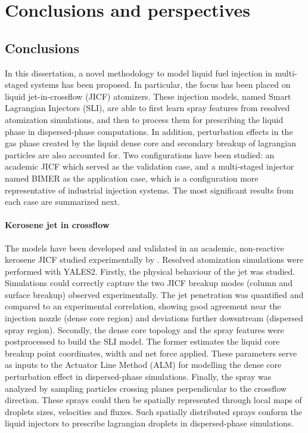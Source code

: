 \chapter{Conclusions and perspectives}

\section*{Conclusions}

In this dissertation, a novel methodology to model liquid fuel injection in multi-staged systems has been proposed. In particular, the focus has been placed on liquid jet-in-crossflow (JICF) atomizers. These injection models, named Smart Lagrangian Injectors (SLI), are able to first learn spray features from resolved atomization simulations, and then to process them for prescribing the liquid phase in dispersed-phase computations. In addition, perturbation effects in the gas phase created by the liquid dense core and secondary breakup of lagrangian particles are also accounted for. Two configurations have been studied: an academic JICF which served as the validation case, and a multi-staged injector named BIMER as the application case, which is a configuration more representative of industrial injection systems. The most significant results from each case are summarized next.


\subsubsection*{Kerosene jet in crossflow}

The models have been developed and validated in an academic, non-reactive kerosene JICF studied experimentally by . Resolved atomization simulations were performed with YALES2. Firstly, the physical behaviour of the jet was studied. Simulations could correctly capture the two JICF breakup modes (column and surface breakup) observed experimentally.  The jet penetration was quantified and compared to an experimental correlation, showing good agreement near the injection nozzle (dense core region) and deviations further dowsntream (dispersed spray region). Secondly, the dense core topology and the spray features were postprocessed to build the SLI model. The former estimates the liquid core breakup point coordinates, width and net force applied. These parameters serve as inputs to the Actuator Line Method (ALM) for modelling the dense core perturbation effect in dispersed-phase simulations. Finally, the spray was analyzed by sampling particles crossing planes perpendicular to the crossflow direction. These sprays could then be spatially represented through local maps of droplets sizes, velocities and fluxes. Such spatially distributed sprays conform the liquid injectors to prescribe lagrangian droplets in dispersed-phase simulations. \\

